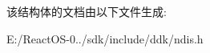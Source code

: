该结构体的文档由以下文件生成\+:\begin{DoxyCompactItemize}
\item 
E\+:/\+React\+O\+S-\/0../sdk/include/ddk/ndis.\+h\end{DoxyCompactItemize}
